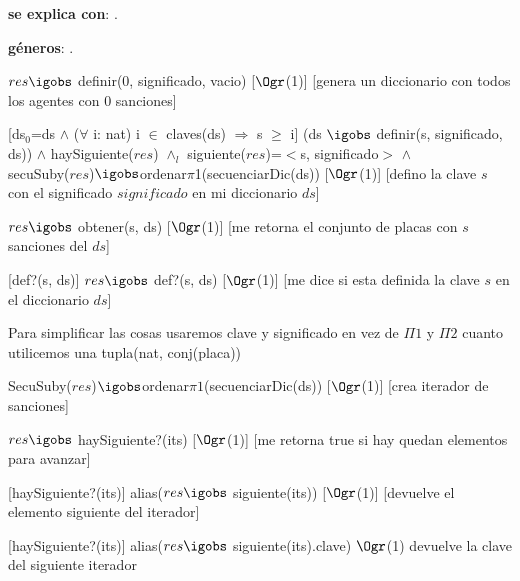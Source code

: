 \begin{Interfaz}

	\textbf{se explica con}: .

	\textbf{géneros}: .


	{$res \igobs$ definir($0$, significado, vacio)}
	[$\Ogr$(1)]
	[genera un diccionario con todos los agentes con $0$ sanciones]

	[ds$_0$=ds $\land$ ($\forall$ i: nat) i $\in$ claves(ds) $\Rightarrow$ s $\geq$ i]
	{(ds $\igobs$ definir(s, significado, ds)) $\land$ haySiguiente($res$) $\land_l$ siguiente($res$)=$<$s, significado$>$ $\land$\\
	secuSuby($res$)$\igobs$ordenar$\pi$1(secuenciarDic(ds))}%
	[$\Ogr$(1)]
	[defino la clave $s$ con el significado $significado$ en mi diccionario $ds$]
	
	{$res \igobs$ obtener(s, ds)}
	[$\Ogr$(1)]
	[me retorna el conjunto de placas con $s$ sanciones del $ds$]

	[def?(s, ds)]
	{$res \igobs$ def?(s, ds)}  
	[$\Ogr$(1)]
	[me dice si esta definida la clave $s$ en el diccionario $ds$]
	
	
	
	Para simplificar las cosas usaremos clave y significado en vez de $\Pi1$ y $\Pi2$ cuanto utilicemos una tupla(nat, conj(placa))
	
	{SecuSuby($res$)$\igobs$ordenar$\pi1$(secuenciarDic(ds))}
	[$\Ogr$(1)]
	[crea iterador de sanciones]
	
	{$res \igobs$ haySiguiente?(its)}
	[$\Ogr$(1)]
	[me retorna true si hay quedan elementos para avanzar]
	
	[haySiguiente?(its)]
	{alias($res \igobs$ siguiente(its))}
	[$\Ogr$(1)]
	[devuelve el elemento siguiente del iterador]
	
	[haySiguiente?(its)]
	{alias($res \igobs$ siguiente(its).clave)}
	{$\Ogr$(1)}
	{devuelve la clave del siguiente iterador}
	

\end{Interfaz}
